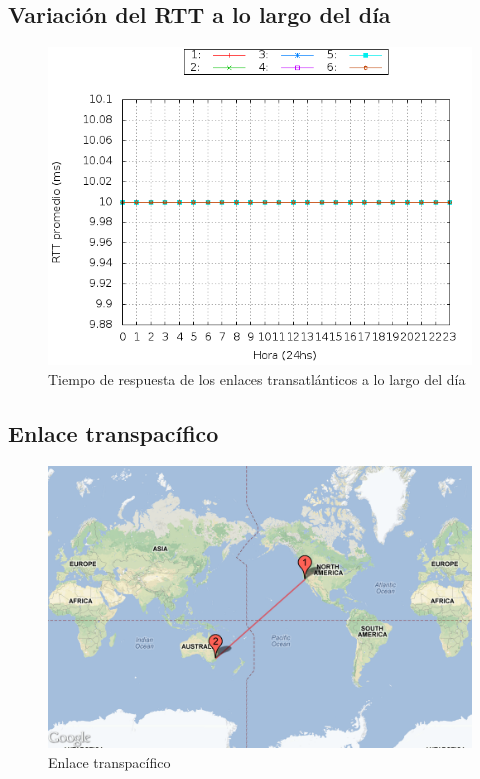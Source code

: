 \subsection{Variación del RTT a lo largo del día}

\begin{figure}[H]
\begin{center}
\includegraphics[width=17cm]{rtts.png}
\end{center}
\caption{Tiempo de respuesta de los enlaces transatlánticos a lo largo del día} \label{figura2}
\end{figure}

\subsection{Enlace transpacífico}

\begin{figure}[H]
\begin{center}
\includegraphics[width=17cm]{enlaceaustralia.png}
\end{center}
\caption{Enlace transpacífico} \label{figura3}
\end{figure}

